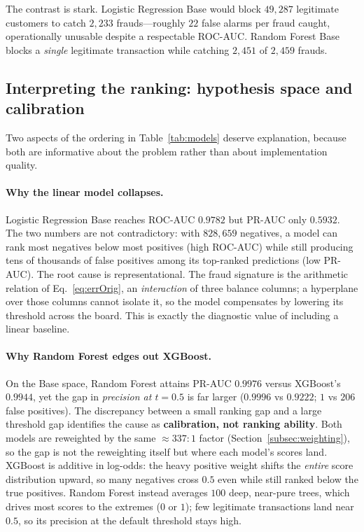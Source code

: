 \documentclass{article}
\begin{document}
The contrast is stark. Logistic Regression Base would block
$49{,}287$ legitimate customers to catch $2{,}233$ frauds---roughly
$22$ false alarms per fraud caught, operationally unusable despite a
respectable ROC-AUC. Random Forest Base blocks a \emph{single}
legitimate transaction while catching $2{,}451$ of $2{,}459$ frauds.

\subsection{Interpreting the ranking: hypothesis space and calibration}
\label{subsec:ranking}
Two aspects of the ordering in Table~\ref{tab:models} deserve
explanation, because both are informative about the problem rather than
about implementation quality.

\paragraph{Why the linear model collapses.} Logistic Regression Base
reaches ROC-AUC $0.9782$ but PR-AUC only $0.5932$. The two numbers are
not contradictory: with $828{,}659$ negatives, a model can rank most
negatives below most positives (high ROC-AUC) while still producing
tens of thousands of false positives among its top-ranked predictions
(low PR-AUC). The root cause is representational. The fraud signature
is the arithmetic relation of Eq.~\ref{eq:errOrig}, an
\emph{interaction} of three balance columns; a hyperplane over those
columns cannot isolate it, so the model compensates by lowering its
threshold across the board. This is exactly the diagnostic value of
including a linear baseline.

\paragraph{Why Random Forest edges out XGBoost.} On the Base space,
Random Forest attains PR-AUC $0.9976$ versus XGBoost's $0.9944$, yet
the gap in \emph{precision at $t = 0.5$} is far larger ($0.9996$ vs
$0.9222$; $1$ vs $206$ false positives). The discrepancy between a
small ranking gap and a large threshold gap identifies the cause as
\textbf{calibration, not ranking ability}. Both models are reweighted
by the same $\approx 337{:}1$ factor (Section~\ref{subsec:weighting}),
so the gap is not the reweighting itself but where each model's scores
land. XGBoost is additive in log-odds: the heavy positive weight shifts
the \emph{entire} score distribution upward, so many negatives cross
$0.5$ even while still ranked below the true positives. Random Forest
instead averages $100$ deep, near-pure trees, which drives most scores
to the extremes ($0$ or $1$); few legitimate transactions land near
$0.5$, so its precision at the default threshold stays high.
\end{document}
